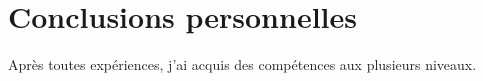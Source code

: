 \chapter{Conclusions personnelles}

Après toutes expériences, j'ai acquis des compétences aux plusieurs niveaux.



